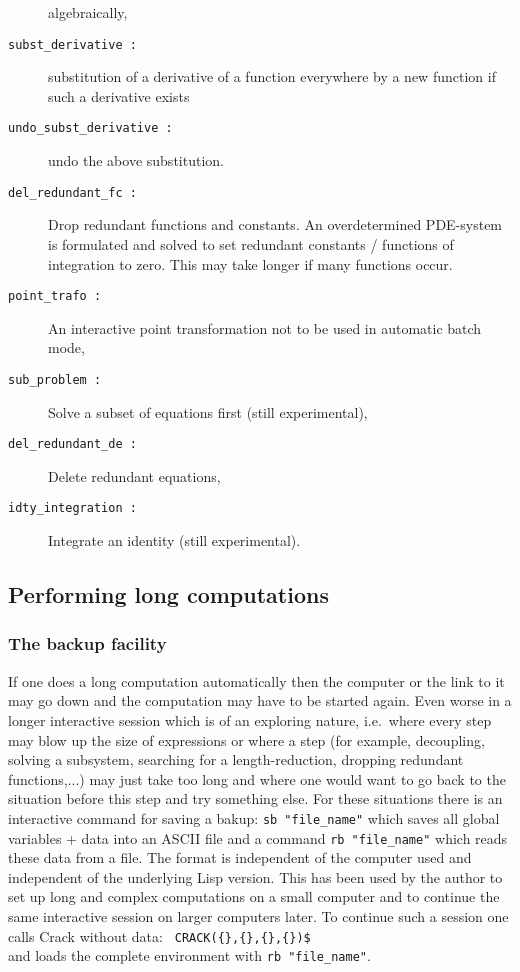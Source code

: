 \documentclass[12pt]{article}
\begin{document}
\begin{description}
algebraically, 
\item[{\tt subst\_derivative :}] substitution of a derivative of a
function everywhere by a new function if such a derivative exists
\item[{\tt undo\_subst\_derivative :}] undo the above substitution.
\item[{\tt del\_redundant\_fc :}] Drop redundant functions and
constants. An overdetermined PDE-system is
formulated and solved to set
redundant constants / functions of integration to zero. This may take longer
if many functions occur.
\item[{\tt point\_trafo :}] An interactive point transformation not to
be used in automatic batch mode,
\item[{\tt sub\_problem :}] Solve a subset of equations first (still
experimental), 
\item[{\tt del\_redundant\_de :}] Delete redundant equations,
\item[{\tt idty\_integration :}] Integrate an identity (still experimental).
\end{description}

\subsection{Performing long computations}
\subsubsection{The backup facility}
If one does a long computation automatically then the computer or the
link to it may go down and the computation may have to be started again.
Even worse in a longer interactive session which is of an
exploring nature, i.e.\ where every step may blow up the size of
expressions or where a step (for example, decoupling, solving a subsystem,
searching for a length-reduction, dropping redundant functions,...) 
may just take too long and where
one would want to go back to the situation before this step and try
something else. For these situations there is an interactive command
for saving a bakup:
{\tt sb "file\_name"} which saves all global variables + data into an
ASCII file and a command {\tt rb "file\_name"} which reads these data from a file.
The format is independent of the computer used and independent
of the underlying {\sc Lisp} version. This has been used
by the author to set up long and complex computations on a small
computer and to continue the same interactive session on larger computers
later. To continue such a session one calls {\sc Crack} without data:
\verb+ CRACK({},{},{},{})$ +\\ %
and loads the complete environment with {\tt rb "file\_name"}.
\end{document}
